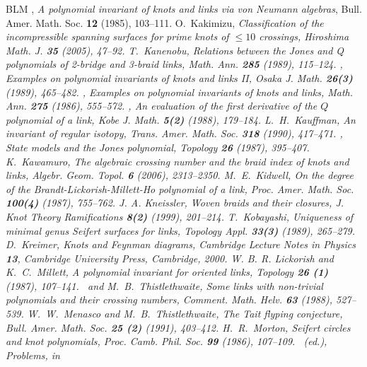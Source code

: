 {\begin{thebibliography}{BLM}
 \bysame, {\em A polynomial
	invariant of knots and links via von Neumann algebras},
	Bull. Amer. Math. Soc. {\bf 12} (1985), 103--111.
 O.~Kakimizu, \em{Classification of the
	incompressible spanning surfaces for prime knots of $\leq 10$
	crossings}, Hiroshima Math. J. {\bf 35} (2005), 47--92.
 T.~Kanenobu, \em{Relations between the
	Jones and Q polynomials of 2-bridge and 3-braid links},
	Math. Ann. {\bf 285} (1989), 115--124.
 \bysame, \em{Examples on polynomial invariants
	of knots and links II}, Osaka J. Math. {\bf 26(3)} (1989),
	465--482.
 \bysame, \em{Examples on polynomial invariants
	of knots and links}, Math. Ann. {\bf 275} (1986), 555--572.
 \bysame, \em{An evaluation of the first
	derivative of the $Q$ polynomial of a link},
	Kobe J. Math. {\bf 5(2)} (1988), 179--184.
 L.\ H.\ Kauffman, {\em An invariant of regular
	isotopy}, Trans. Amer. Math. Soc. {\bf 318} (1990), 417--471.
 \bysame, {\em State models and
	the Jones polynomial}, Topology {\bf 26} (1987), 395--407.
 K.~Kawamuro, \em{The algebraic crossing number
	and the braid index of knots and links},
	Algebr. Geom. Topol. {\bf 6} (2006), 2313--2350. 
 M.~E.~Kidwell, \em{On the degree of the
	Brandt-Lickorish-Millett-Ho polynomial of a link},
	Proc. Amer. Math. Soc. {\bf 100(4)} (1987), 755--762.
 J. A. Kneissler, \em{Woven braids and their
	closures}, J. Knot Theory Ramifications {\bf 8(2)} (1999),
	201--214.
 T.~Kobayashi, \em{Uniqueness of minimal
	genus Seifert surfaces for links},
	Topology Appl. {\bf 33(3)} (1989), 265--279.
 D.\ Kreimer, \em{Knots and Feynman diagrams},
	Cambridge Lecture Notes in Physics {\bf 13},
	Cambridge University Press, Cambridge, 2000.
 W. B. R. Lickorish and K.~C.~Millett, {\em A
	polynomial invariant for oriented links}, Topology
	{\bf 26 (1)} (1987), 107--141.
 \bysame\, and M.~B.~Thistlethwaite,
	\em{Some links with non-trivial polynomials and their crossing
	numbers}, Comment. Math. Helv. {\bf 63} (1988), 527--539.
 W.~W.~Menasco and M.~B.~Thistlethwaite, \em{%
  	The Tait flyping conjecture}, Bull. Amer. Math. Soc. {\bf
    	25 (2)} (1991), 403--412.
 H.~R.~Morton, \em{Seifert circles and knot
	polynomials}, Proc. Camb. Phil. Soc. {\bf 99} (1986), 107--109.
 \bysame\ (ed.), {\em Problems},  in

\end{thebibliography}}
